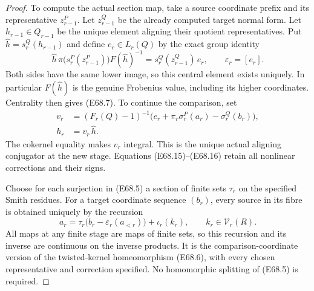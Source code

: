 \begin{proof}
To compute the actual section map, take a source
coordinate prefix and its representative
$z_{r-1}^P$. Let $z_{r-1}^Q$ be the already computed
target normal form. Let $h_{r-1}\in Q_{r-1}$ be
the unique element aligning their quotient
representatives. Put $\widehat h=s_r^Q(h_{r-1})$
and define $e_r\in L_r(Q)$ by the exact group
identity
\[
 \widehat h\,\pi\bigl(s_r^P(z_{r-1}^P)\bigr)
       F(\widehat h)^{-1}
          =s_r^Q(z_{r-1}^Q)\,e_r,
 \qquad \varepsilon_r=[e_r].
 \tag{E68.15}
\]
Both sides have the same lower image, so this
central element exists uniquely. In particular
$F(\widehat h)$ is the genuine Frobenius value,
including its higher coordinates.
Centrality then gives (E68.7). To continue the
comparison, set
\[
 \begin{split}
 v_r&=(F_r(Q)-1)^{-1}
    \bigl(e_r+\pi_r\sigma_r^P(a_r)
                    -\sigma_r^Q(b_r)\bigr),\\
 h_r&=v_r\,\widehat h .
 \end{split}
 \tag{E68.16}
\]
The cokernel equality makes $v_r$ integral.
This is the unique actual aligning conjugator at
the new stage. Equations (E68.15)--(E68.16)
retain all nonlinear corrections and their signs.

Choose for each surjection in (E68.5) a section
of finite sets $\tau_r$ on the specified Smith
residues. For a target coordinate sequence
$(b_r)$, every source in its fibre is obtained
uniquely by the recursion
\[
       a_r=\tau_r\bigl(b_r-\varepsilon_r(a_{<r})\bigr)
                          +\iota_r(k_r),
             \qquad k_r\in\mathcal V_r(R).
 \tag{E68.17}
\]
All maps at any finite stage are maps of finite
sets, so this recursion and its inverse are
continuous on the inverse products.
It is the comparison-coordinate version of the
twisted-kernel homeomorphism (E68.6), with every
chosen representative and correction specified.
No homomorphic splitting of (E68.5) is required.


\end{proof}
